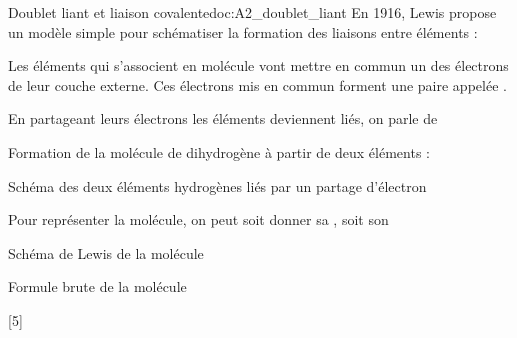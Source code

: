 \begin{doc}{Doublet liant et liaison covalente}{doc:A2_doublet_liant}
  En 1916, Lewis propose un modèle simple pour schématiser la formation des liaisons entre éléments :
  \begin{importants}  
    Les éléments qui s'associent en molécule vont mettre en commun un des électrons de leur couche externe.
    Ces électrons mis en commun forment une paire appelée .
  \end{importants}
  \begin{importants}  
    En partageant leurs électrons les éléments deviennent liés, on parle de 
  \end{importants}

  
  \exemple Formation de la molécule de dihydrogène  à partir de deux éléments  :
  
  \begin{center}
    {\small Schéma des deux éléments hydrogènes liés par un partage d'électron}
    \vspace{8pt}
    
  \end{center}

  Pour représenter la molécule, on peut soit donner sa , soit son 
  \begin{multicols}{2}
    \begin{center}
      Schéma de Lewis de la molécule \\[4pt]

      {\Large {}}
    \end{center}

    \begin{center}
      Formule brute de la molécule \\[4pt]

      {\Large {}}
    \end{center}
  \end{multicols}
\end{doc}

\newpage
{}[5]

